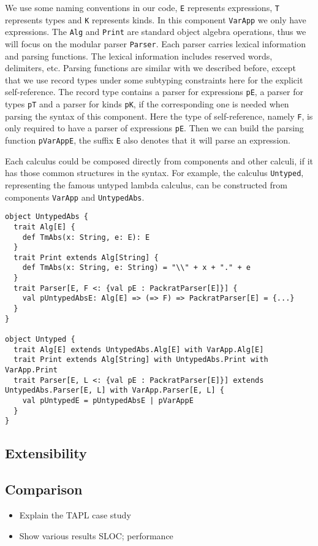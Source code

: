 We use some naming conventions in our code, \lstinline{E} represents expressions, \lstinline{T} represents types and \lstinline{K} represents kinds. In this component \lstinline{VarApp} we only have expressions. The \lstinline{Alg} and \lstinline{Print} are standard object algebra operations, thus we will focus on the modular parser \lstinline{Parser}. Each parser carries lexical information and parsing functions. The lexical information includes reserved words, delimiters, etc. Parsing functions are similar with we described before, except that we use record types under some subtyping constraints here for the explicit self-reference. The record type contains a parser for expressions \lstinline{pE}, a parser for types \lstinline{pT} and a parser for kinds \lstinline{pK}, if the corresponding one is needed when parsing the syntax of this component. Here the type of self-reference, namely \lstinline{F}, is only required to have a parser of expressions \lstinline{pE}. Then we can build the parsing function \lstinline{pVarAppE}, the suffix \lstinline{E} also denotes that it will parse an expression.

Each calculus could be composed directly from components and other calculi, if it has those common structures in the syntax. For example, the calculus \lstinline{Untyped}, representing the famous untyped lambda calculus, can be constructed from components \lstinline{VarApp} and \lstinline{UntypedAbs}.

\begin{lstlisting}
object UntypedAbs {
  trait Alg[E] {
    def TmAbs(x: String, e: E): E
  }
  trait Print extends Alg[String] {
    def TmAbs(x: String, e: String) = "\\" + x + "." + e
  }
  trait Parser[E, F <: {val pE : PackratParser[E]}] {
    val pUntypedAbsE: Alg[E] => (=> F) => PackratParser[E] = {...}
  }
}

object Untyped {
  trait Alg[E] extends UntypedAbs.Alg[E] with VarApp.Alg[E]
  trait Print extends Alg[String] with UntypedAbs.Print with VarApp.Print
  trait Parser[E, L <: {val pE : PackratParser[E]}] extends UntypedAbs.Parser[E, L] with VarApp.Parser[E, L] {
    val pUntypedE = pUntypedAbsE | pVarAppE
  }
}
\end{lstlisting}

\subsection{Extensibility}\label{subsec:extensibility}

\subsection{Comparison}\label{subsec:comparison}

\begin{itemize}
\item Explain the TAPL case study
\item Show various results SLOC; performance
\end{itemize}
